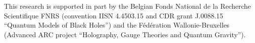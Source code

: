 \documentclass[12pt]{article}
\numberwithin{equation}{section}
\begin{document}
This research is supported in part by the Belgian Fonds National de la Recherche Scientifique FNRS (convention IISN 4.4503.15 and CDR grant J.0088.15 ``Quantum Models of Black Holes'') and the F\'ed\'eration Wallonie-Bruxelles (Advanced ARC project ``Holography, Gauge Theories and Quantum Gravity'').

%
%
%

%

%

%
\end{document}

